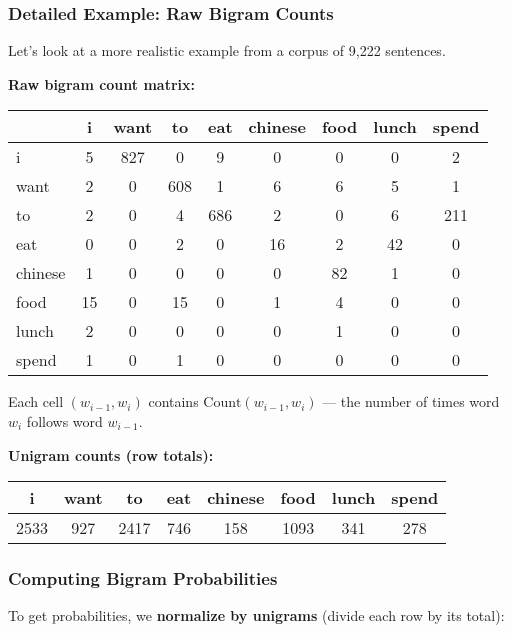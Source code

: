 \documentclass[11pt,a4paper]{article}
\theoremstyle{definition}
\theoremstyle{plain}
\theoremstyle{remark}
\begin{document}
\subsubsection{Detailed Example: Raw Bigram Counts}

Let's look at a more realistic example from a corpus of 9,222 sentences.

\textbf{Raw bigram count matrix:}

\begin{center}
\begin{tabular}{|l||c|c|c|c|c|c|c|c|}
\hline
 & i & want & to & eat & chinese & food & lunch & spend \\
\hline\hline
i & 5 & 827 & 0 & 9 & 0 & 0 & 0 & 2 \\
want & 2 & 0 & 608 & 1 & 6 & 6 & 5 & 1 \\
to & 2 & 0 & 4 & 686 & 2 & 0 & 6 & 211 \\
eat & 0 & 0 & 2 & 0 & 16 & 2 & 42 & 0 \\
chinese & 1 & 0 & 0 & 0 & 0 & 82 & 1 & 0 \\
food & 15 & 0 & 15 & 0 & 1 & 4 & 0 & 0 \\
lunch & 2 & 0 & 0 & 0 & 0 & 1 & 0 & 0 \\
spend & 1 & 0 & 1 & 0 & 0 & 0 & 0 & 0 \\
\hline
\end{tabular}
\end{center}

Each cell $(w_{i-1}, w_i)$ contains $\text{Count}(w_{i-1}, w_i)$ — the number of times word $w_i$ follows word $w_{i-1}$.

\textbf{Unigram counts (row totals):}

\begin{center}
\begin{tabular}{|c|c|c|c|c|c|c|c|}
\hline
i & want & to & eat & chinese & food & lunch & spend \\
\hline
2533 & 927 & 2417 & 746 & 158 & 1093 & 341 & 278 \\
\hline
\end{tabular}
\end{center}

\subsubsection{Computing Bigram Probabilities}

To get probabilities, we \textbf{normalize by unigrams} (divide each row by its total):
\end{document}
